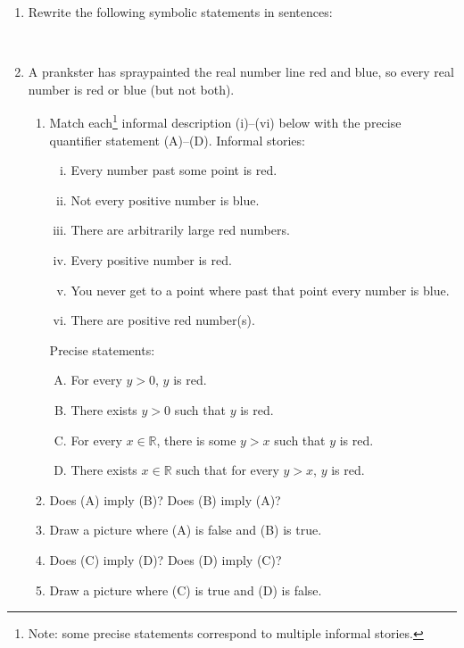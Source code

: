 \documentclass[12pt]{amsart}
\newcommand{\R}{\mathbb{R}}
\begin{document}
\begin{enumerate}\setcounter{enumi}{0}
\item Rewrite the following symbolic statements in sentences:



\

\item A prankster has spraypainted the real number line red and blue, so every real number is red or blue (but not both).
\begin{enumerate}
\item Match each\footnote{Note: some precise statements correspond to multiple informal stories.} informal description (i)--(vi) below with the precise quantifier statement (A)--(D).
Informal stories:
\begin{enumerate}[(i)]
\item Every number past some point is red.

\item Not every positive number is blue.

\item There are arbitrarily large red numbers.

\item Every positive number is red.

\item You never get to a point where past that point every number is blue.

\item There are positive red number(s).
\end{enumerate}

Precise statements:
\begin{enumerate}[(A)]
\item For every $y>0$, $y$ is red.

\item There exists $y>0$ such that $y$ is red.

\item For every $x\in \R$, there is some $y>x$ such that $y$ is red.

\item There exists $x\in \R$ such that for every $y>x$, $y$ is red.
\end{enumerate}

\item Does (A) imply (B)? Does (B) imply (A)?
\item Draw a picture where (A) is false and (B) is true.
\item Does (C) imply (D)? Does (D) imply (C)?
\item Draw a picture where (C) is true and (D) is false. 
\end{enumerate}


\end{enumerate}
\end{document}
